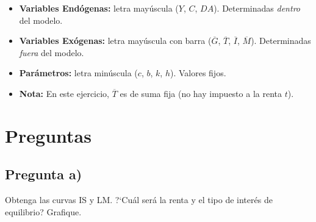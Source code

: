\documentclass[11pt,a4paper]{article}
\newcommand{\barvar}[1]{\overline{#1}}
\begin{document}
\begin{hintbox}
\begin{itemize}[leftmargin=1.2em, itemsep=2pt]
    \item \textbf{Variables End\'{o}genas:} letra may\'{u}scula ($Y$, $C$, $DA$). Determinadas \emph{dentro} del modelo.
    \item \textbf{Variables Ex\'{o}genas:} letra may\'{u}scula con barra ($\barvar{G}$, $\barvar{T}$, $\barvar{I}$, $\barvar{M}$). Determinadas \emph{fuera} del modelo.
    \item \textbf{Par\'{a}metros:} letra min\'{u}scula ($c$, $b$, $k$, $h$). Valores fijos.
    \item \textbf{Nota:} En este ejercicio, $\barvar{T}$ es de suma fija (no hay impuesto a la renta $t$).
\end{itemize}
\end{hintbox}


\section{Preguntas}

\subsection{Pregunta a)}

\noindent Obtenga las curvas IS y LM. ?`Cu\'{a}l ser\'{a} la renta y el tipo de inter\'{e}s de equilibrio? Grafique.

\vspace{0.4cm}
\end{document}
